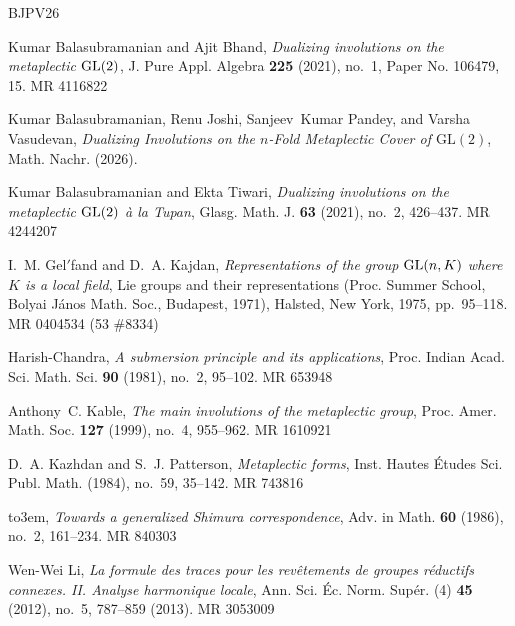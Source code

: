 \documentclass[11pt, a4paper, reqno]{amsart}
\theoremstyle{definition}
\theoremstyle{remark}
\theoremstyle{example}
\theoremstyle{note}
\numberwithin{equation}{section}
\begin{document}
\def\cprime{$'$}
\providecommand{\bysame}{\leavevmode\hbox to3em{\hrulefill}\thinspace}
\providecommand{\MR}{\relax\ifhmode\unskip\space\fi MR }
\providecommand{\MRhref}[2]{%
  \href{http://www.ams.org/mathscinet-getitem?mr=#1}{#2}
}
\providecommand{\href}[2]{#2}
\begin{thebibliography}{BJPV26}

Kumar Balasubramanian and Ajit Bhand, \emph{Dualizing involutions on the metaplectic {${\rm GL}(2)$}}, J. Pure Appl. Algebra \textbf{225} (2021), no.~1, Paper No. 106479, 15. \MR{4116822}

Kumar Balasubramanian, Renu Joshi, Sanjeev~Kumar Pandey, and Varsha Vasudevan, \emph{Dualizing {I}nvolutions on the $n$-{F}old {M}etaplectic {C}over of $\mathrm{GL}(2)$}, Math. Nachr. (2026).

Kumar Balasubramanian and Ekta Tiwari, \emph{Dualizing involutions on the metaplectic {${\rm GL}(2)$} {\it \`a{} la} {T}upan}, Glasg. Math. J. \textbf{63} (2021), no.~2, 426--437. \MR{4244207}

I.~M. Gel{\cprime}fand and D.~A. Kajdan, \emph{Representations of the group {${\rm GL}(n,K)$} where {$K$} is a local field}, Lie groups and their representations ({P}roc. {S}ummer {S}chool, {B}olyai {J}\'anos {M}ath. {S}oc., {B}udapest, 1971), Halsted, New York, 1975, pp.~95--118. \MR{0404534 (53 \#8334)}

Harish-Chandra, \emph{A submersion principle and its applications}, Proc. Indian Acad. Sci. Math. Sci. \textbf{90} (1981), no.~2, 95--102. \MR{653948}

Anthony~C. Kable, \emph{The main involutions of the metaplectic group}, Proc. Amer. Math. Soc. \textbf{127} (1999), no.~4, 955--962. \MR{1610921}

D.~A. Kazhdan and S.~J. Patterson, \emph{Metaplectic forms}, Inst. Hautes \'{E}tudes Sci. Publ. Math. (1984), no.~59, 35--142. \MR{743816}

\bysame, \emph{Towards a generalized {S}himura correspondence}, Adv. in Math. \textbf{60} (1986), no.~2, 161--234. \MR{840303}

Wen-Wei Li, \emph{La formule des traces pour les rev\^{e}tements de groupes r\'{e}ductifs connexes. {II}. {A}nalyse harmonique locale}, Ann. Sci. \'{E}c. Norm. Sup\'{e}r. (4) \textbf{45} (2012), no.~5, 787--859 (2013). \MR{3053009}


\end{thebibliography}
\end{document}
